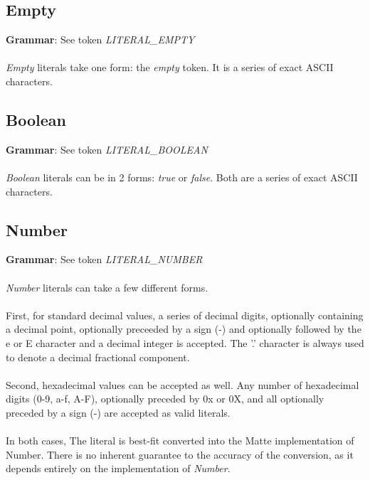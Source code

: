 \documentclass[12pt,letterpaper]{report}
\begin{document}
\subsection{Empty}\label{EmptyLiterals}

\textbf{Grammar}: See token \textit{LITERAL\_EMPTY}
\\\\
\textit{Empty} literals take one form: the \textit{empty} token.
It is a series of exact ASCII characters.







\subsection{Boolean}\label{BooleanLiterals}

\textbf{Grammar}: See token \textit{LITERAL\_BOOLEAN}
\\\\
\textit{Boolean} literals can be in 2 forms: \textit{true} or \textit{false}.
Both are a series of exact ASCII characters.




\subsection{Number}\label{NumberLiterals}

\textbf{Grammar}: See token \textit{LITERAL\_NUMBER}
\\\\
\textit{Number} literals can take a few different forms.
\\\\
First, for standard decimal values, a series of decimal digits, optionally containing a decimal point, 
optionally preceeded by a sign (-) and optionally followed by the e or E character and a 
decimal integer is accepted. The '.' character is always used to denote a decimal fractional component.
\\\\
Second, hexadecimal values can be accepted as well. Any number of hexadecimal digits (0-9, a-f, A-F), 
optionally preceded by 0x or 0X, and all optionally preceded by a sign (-) are accepted 
as valid literals.
\\\\
In both cases, The literal is best-fit converted into the Matte implementation of Number. 
There is no inherent guarantee to the accuracy of the conversion, as it depends 
entirely on the implementation of \textit{Number}.
\end{document}
